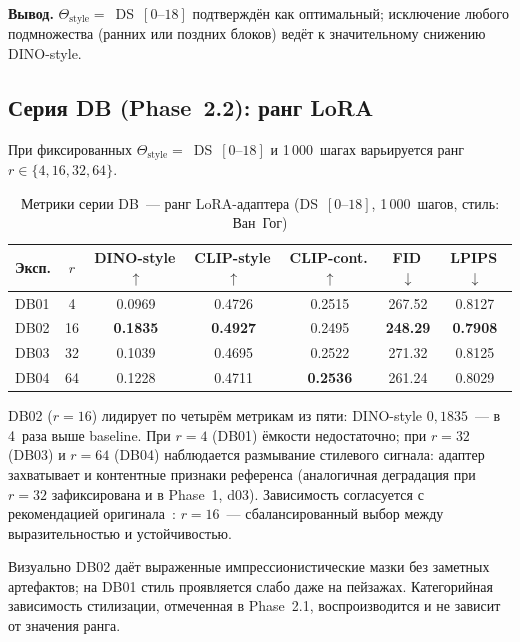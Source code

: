 \textbf{Вывод.} $\Theta_\text{style}{=}$~DS~$[0\text{--}18]$ подтверждён как оптимальный; исключение любого подмножества (ранних или поздних блоков) ведёт к значительному снижению DINO-style.

\subsection{Серия DB (Phase~2.2): ранг LoRA}
\label{sec:results_phase2_db}

При фиксированных $\Theta_\text{style}{=}$~DS~$[0\text{--}18]$ и 1\,000~шагах варьируется ранг $r \in \{4, 16, 32, 64\}$.

\begin{table}[h]
\centering
\caption{Метрики серии DB~--- ранг LoRA-адаптера (DS~$[0\text{–}18]$, 1\,000~шагов, стиль: Ван~Гог)}
\label{tab:phase2_db_metrics}
\begingroup\small
\begin{tabular}{lcccccc}
\hline
\textbf{Эксп.} & \textbf{$r$} & \textbf{DINO-style\,$\uparrow$} & \textbf{CLIP-style\,$\uparrow$} & \textbf{CLIP-cont.\,$\uparrow$} & \textbf{FID\,$\downarrow$} & \textbf{LPIPS\,$\downarrow$} \\
\hline
DB01 & 4  & 0.0969          & 0.4726          & 0.2515          & 267.52          & 0.8127          \\
DB02 & 16 & \textbf{0.1835} & \textbf{0.4927} & 0.2495          & \textbf{248.29} & \textbf{0.7908} \\
DB03 & 32 & 0.1039          & 0.4695          & 0.2522          & 271.32          & 0.8125          \\
DB04 & 64 & 0.1228          & 0.4711          & \textbf{0.2536} & 261.24          & 0.8029          \\
\hline
\end{tabular}\endgroup
\end{table}

DB02 ($r{=}16$) лидирует по четырём метрикам из пяти: DINO-style $0{,}1835$~--- в 4~раза выше baseline. При $r{=}4$ (DB01) ёмкости недостаточно; при $r{=}32$ (DB03) и $r{=}64$ (DB04) наблюдается размывание стилевого сигнала: адаптер захватывает и контентные признаки референса (аналогичная деградация при $r{=}32$ зафиксирована и в Phase~1, d03). Зависимость согласуется с рекомендацией оригинала~\cite{frenkel2024blora}: $r{=}16$~--- сбалансированный выбор между выразительностью и устойчивостью.

Визуально DB02 даёт выраженные импрессионистические мазки без заметных артефактов; на DB01 стиль проявляется слабо даже на пейзажах. Категорийная зависимость стилизации, отмеченная в Phase~2.1, воспроизводится и не зависит от значения ранга.

